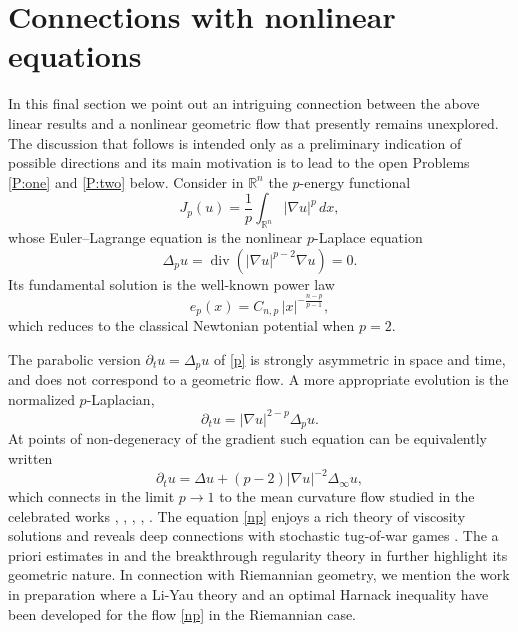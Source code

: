 \documentclass[11pt,a4paper]{amsart}
\newcommand{\Rn}{\mathbb R^n}
\numberwithin{equation}{section}
\numberwithin{equation}{section}
\begin{document}
\section{Connections with nonlinear equations}\label{S:np}

In this final section we point out an intriguing connection between the above linear results and a nonlinear geometric flow that presently remains  unexplored. The discussion that follows is intended only as a preliminary indication of possible directions and its main motivation is to lead to the open Problems \ref{P:one} and \ref{P:two} below.
Consider in $\Rn$ the $p$-energy functional
\[
J_p(u) = \frac1p\int_{\Rn} |\nabla u|^p\, dx,
\]
whose Euler–Lagrange equation is the nonlinear $p$-Laplace equation
\begin{equation}\label{p}
\Delta_p u = \operatorname{div}(|\nabla u|^{p-2}\nabla u)=0.
\end{equation}
Its fundamental solution is the well-known power law
\begin{equation}\label{ep}
e_p(x)= C_{n,p}\, |x|^{-\frac{n-p}{p-1}},
\end{equation}
which reduces to the classical Newtonian potential when $p=2$.

The parabolic version $\partial_t u=\Delta_p u$ of \eqref{p} is strongly asymmetric in space and time, and  does not correspond to a geometric flow. A more appropriate evolution is the normalized $p$-Laplacian,
\[
\partial_t u = |\nabla u|^{2-p}\Delta_p u.
\]
At points of non-degeneracy of the gradient such equation can be equivalently written
\begin{equation}\label{np}
\partial_t u
   = \Delta u + (p-2)|\nabla u|^{-2}\Delta_\infty u,
\end{equation}
which connects in the limit $p\to 1$ to the mean curvature flow studied in the celebrated works \cite{ES1}, \cite{ES2}, \cite{ES3}, \cite{ES4}, \cite{SZ, CGG, CW, GGIS, ISZ}. The equation \eqref{np} enjoys a rich theory of viscosity solutions \cite{BG, Do} and reveals deep connections with stochastic tug-of-war games \cite{PS, MPR}. The a priori estimates in \cite{BG2} and the breakthrough regularity theory in \cite{JS} further highlight its geometric nature. In connection with Riemannian geometry, we mention the work in preparation \cite{BGM} where a Li-Yau theory and an optimal Harnack inequality have been developed for the flow \eqref{np} in the Riemannian case.
\end{document}
